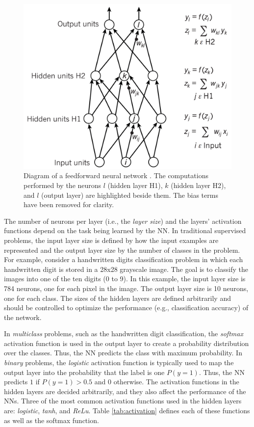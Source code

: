 \begin{figure}[!h]
\centering
\includegraphics[width=0.6\columnwidth]{imgs/background/ann.png}
\caption{Diagram of a feedforward neural network \cite{lecun2015deep}. The computations performed by the neurons $l$ (hidden layer H1), $k$ (hidden layer H2), and $l$ (output layer) are highlighted beside them. The bias terms have been removed for clarity.}
\label{fig:nn}
\end{figure}

The number of neurons per layer (i.e., the \textit{layer size}) and the layers' activation functions depend on the task being learned by the NN. In traditional supervised problems, the input layer size is defined by how the input examples are represented and the output layer size by the number of classes in the problem. For example, consider a handwritten digits classification problem in which each handwritten digit is stored in a 28x28 grayscale image. The goal is to classify the images into one of the ten digits (0 to 9). In this example, the input layer size is 784 neurons, one for each pixel in the image. The output layer size is 10 neurons, one for each class. The sizes of the hidden layers are defined arbitrarily and should be controlled to optimize the performance (e.g., classification accuracy) of the network.

In \textit{multiclass} problems, such as the handwritten digit classification, the \textit{softmax} activation function is used in the output layer to create a probability distribution over the classes. Thus, the NN predicts the class with maximum probability. In \textit{binary} problems, the \textit{logistic} activation function is typically used to map the output layer into the probability that the label is one $P(y = 1)$. Thus, the NN predicts $1$ if $P(y = 1) > 0.5$ and $0$ otherwise. The activation functions in the hidden layers are decided arbitrarily, and they also affect the performance of the NNs. Three of the most common activation functions used in the hidden layers are: \textit{logistic}, \textit{tanh}, and \textit{ReLu}. Table \ref{tab:activation} defines each of these functions as well as the softmax function.

